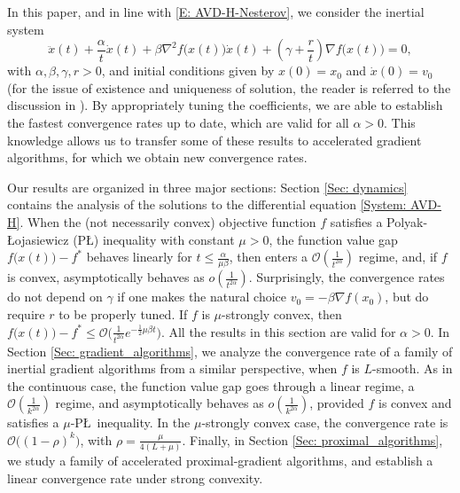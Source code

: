 \documentclass[onefignum,onetabnum]{siamart220329}
\begin{document}
In this paper, and in line with \eqref{E: AVD-H-Nesterov}, we consider the inertial system
\begin{equation}\label{System: AVD-H}\tag{AVD-H}
\ddot{x}(t) + \frac{\alpha}{t}\dot{x}(t) + \beta\nabla^2 f\big(x(t)\big)\dot{x}(t) + \left( \gamma + \frac{r}{t} \right) \nabla f\big(x(t)\big) = 0,
\end{equation}
with $\alpha,\beta,\gamma,r > 0$, and initial conditions given by $x(0) = x_0$ and $\dot{x}(0) = v_0$ (for the issue of existence and uniqueness of solution, the reader is referred to the discussion in \cite{Juan_2023}). By appropriately tuning the coefficients, we are able to establish the fastest convergence rates up to date, which are valid for all $\alpha>0$. This knowledge allows us to transfer some of these results to accelerated gradient algorithms, for which we obtain new convergence rates. 

Our results are organized in three major sections:
Section \ref{Sec: dynamics} contains the analysis of the solutions to the differential equation \eqref{System: AVD-H}. When the (not necessarily convex) objective function $f$ satisfies a Polyak-\L ojasiewicz (P\L) inequality with constant $\mu>0$, the function value gap $f\big(x(t)\big)-f^*$ behaves linearly for $t\le\frac{\alpha}{\mu\beta}$, then enters a $\mathcal O(\frac{1}{t^{2\alpha}})$ regime, and, if $f$ is convex, asymptotically behaves as $o(\frac{1}{t^{2\alpha}})$. Surprisingly, the convergence rates do not depend on $\gamma$ if one makes the natural choice $v_0=-\beta\nabla f(x_0)$, but do require $r$ to be properly tuned. If $f$ is $\mu$-strongly convex, then $f\big(x(t)\big)-f^*\le \mathcal O\big(\frac{1}{t^{2\alpha}}e^{-\frac{1}{2}\mu\beta t}\big)$. All the results in this section are valid for $\alpha>0$. 
In Section \ref{Sec: gradient_algorithms}, we analyze the convergence rate of a family of inertial gradient algorithms from a similar perspective, when $f$ is $L$-smooth. As in the continuous case, the function value gap goes through a linear regime, a $\mathcal O(\frac{1}{k^{2\alpha}})$ regime, and asymptotically behaves as $o(\frac{1}{k^{2\alpha}})$, provided $f$ is convex and satisfies a $\mu$-P\L\ inequality. In the $\mu$-strongly convex case, the convergence rate is $\mathcal O\big((1-\rho)^k\big)$, with $\rho=\frac{\mu}{4(L+\mu)}$. Finally, in Section \ref{Sec: proximal_algorithms}, we study a family of accelerated proximal-gradient algorithms, and establish a linear convergence rate under strong convexity.

 
     
\end{document}
